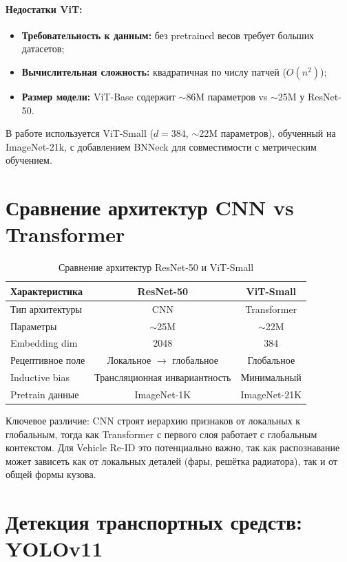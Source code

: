 \paragraph{Недостатки ViT:}
\begin{itemize}
  \item \textbf{Требовательность к данным:} без pretrained весов требует больших датасетов;
  \item \textbf{Вычислительная сложность:} квадратичная по числу патчей (\(O(n^2)\));
  \item \textbf{Размер модели:} ViT-Base содержит $\sim$86M параметров vs $\sim$25M у ResNet-50.
\end{itemize}

В работе используется ViT-Small (\(d=384\), $\sim$22M параметров), обученный на ImageNet-21k, с добавлением BNNeck для совместимости с метрическим обучением.

\section{Сравнение архитектур CNN vs Transformer}

\begin{table}[h!]
\centering
\caption{Сравнение архитектур ResNet-50 и ViT-Small}
\label{tab:arch_comparison}
\begin{tabular}{l|c|c}
\hline
\textbf{Характеристика} & \textbf{ResNet-50} & \textbf{ViT-Small} \\
\hline
Тип архитектуры & CNN & Transformer \\
Параметры & $\sim$25M & $\sim$22M \\
Embedding dim & 2048 & 384 \\
Рецептивное поле & Локальное $\rightarrow$ глобальное & Глобальное \\
Inductive bias & Трансляционная инвариантность & Минимальный \\
Pretrain данные & ImageNet-1K & ImageNet-21K \\
\hline
\end{tabular}
\end{table}

Ключевое различие: CNN строят иерархию признаков от локальных к глобальным, тогда как Transformer с первого слоя работает с глобальным контекстом. Для Vehicle Re-ID это потенциально важно, так как распознавание может зависеть как от локальных деталей (фары, решётка радиатора), так и от общей формы кузова.

\section{Детекция транспортных средств: YOLOv11}

